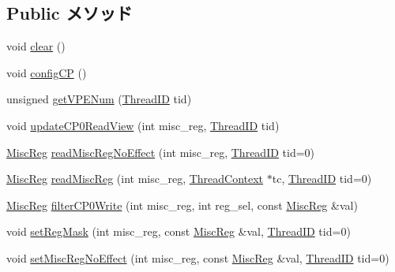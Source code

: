 \subsection*{Public メソッド}
\begin{DoxyCompactItemize}
\item 
void \hyperlink{classMipsISA_1_1ISA_ac8bb3912a3ce86b15842e79d0b421204}{clear} ()
\item 
void \hyperlink{classMipsISA_1_1ISA_af9cb72b444a0f6c58cb2ca90573144eb}{configCP} ()
\item 
unsigned \hyperlink{classMipsISA_1_1ISA_ac14017b7c7cddd04d2e028cde54f6165}{getVPENum} (\hyperlink{base_2types_8hh_ab39b1a4f9dad884694c7a74ed69e6a6b}{ThreadID} tid)
\item 
void \hyperlink{classMipsISA_1_1ISA_ab5936dc40fc4dbeac3066d5d7cffeb11}{updateCP0ReadView} (int misc\_\-reg, \hyperlink{base_2types_8hh_ab39b1a4f9dad884694c7a74ed69e6a6b}{ThreadID} tid)
\item 
\hyperlink{namespaceMipsISA_aa16539aa6584fd12f7d6fa868f75b4de}{MiscReg} \hyperlink{classMipsISA_1_1ISA_af2ec8925148a53b9bddefb7fb65a7223}{readMiscRegNoEffect} (int misc\_\-reg, \hyperlink{base_2types_8hh_ab39b1a4f9dad884694c7a74ed69e6a6b}{ThreadID} tid=0)
\item 
\hyperlink{namespaceMipsISA_aa16539aa6584fd12f7d6fa868f75b4de}{MiscReg} \hyperlink{classMipsISA_1_1ISA_a81ac5a0c0d9b625997d7737f911743b1}{readMiscReg} (int misc\_\-reg, \hyperlink{classThreadContext}{ThreadContext} $\ast$tc, \hyperlink{base_2types_8hh_ab39b1a4f9dad884694c7a74ed69e6a6b}{ThreadID} tid=0)
\item 
\hyperlink{namespaceMipsISA_aa16539aa6584fd12f7d6fa868f75b4de}{MiscReg} \hyperlink{classMipsISA_1_1ISA_aadf74b7e5f09ecd0cc35aeb0a25b4420}{filterCP0Write} (int misc\_\-reg, int reg\_\-sel, const \hyperlink{namespaceMipsISA_aa16539aa6584fd12f7d6fa868f75b4de}{MiscReg} \&val)
\item 
void \hyperlink{classMipsISA_1_1ISA_a01507af6f09e43b4f9ece624fdafb1cc}{setRegMask} (int misc\_\-reg, const \hyperlink{namespaceMipsISA_aa16539aa6584fd12f7d6fa868f75b4de}{MiscReg} \&val, \hyperlink{base_2types_8hh_ab39b1a4f9dad884694c7a74ed69e6a6b}{ThreadID} tid=0)
\item 
void \hyperlink{classMipsISA_1_1ISA_ab8dd4afdd4e652ca191b235505691f68}{setMiscRegNoEffect} (int misc\_\-reg, const \hyperlink{namespaceMipsISA_aa16539aa6584fd12f7d6fa868f75b4de}{MiscReg} \&val, \hyperlink{base_2types_8hh_ab39b1a4f9dad884694c7a74ed69e6a6b}{ThreadID} tid=0)
\item 

\end{DoxyCompactItemize}
